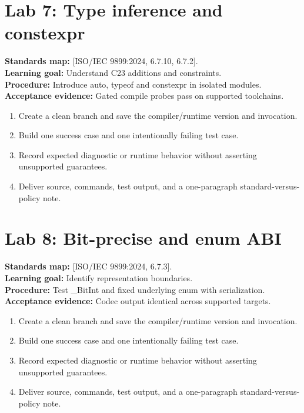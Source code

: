 \documentclass[10pt,letterpaper,oneside]{report}
\newcommand{\refcl}[1]{\textsf{\footnotesize[ISO/IEC 9899:2024, #1]}}
\begin{document}
\section{Lab 7: Type inference and constexpr}
\textbf{Standards map:} \refcl{6.7.10, 6.7.2}.\\
\textbf{Learning goal:} Understand C23 additions and constraints.\\
\textbf{Procedure:} Introduce auto, typeof and constexpr in isolated modules.\\
\textbf{Acceptance evidence:} Gated compile probes pass on supported toolchains.
\begin{enumerate}
\item Create a clean branch and save the compiler/runtime version and invocation.
\item Build one success case and one intentionally failing test case.
\item Record expected diagnostic or runtime behavior without asserting unsupported guarantees.
\item Deliver source, commands, test output, and a one-paragraph standard-versus-policy note.
\end{enumerate}

\section{Lab 8: Bit-precise and enum ABI}
\textbf{Standards map:} \refcl{6.7.3}.\\
\textbf{Learning goal:} Identify representation boundaries.\\
\textbf{Procedure:} Test \_BitInt and fixed underlying enum with serialization.\\
\textbf{Acceptance evidence:} Codec output identical across supported targets.
\begin{enumerate}
\item Create a clean branch and save the compiler/runtime version and invocation.
\item Build one success case and one intentionally failing test case.
\item Record expected diagnostic or runtime behavior without asserting unsupported guarantees.
\item Deliver source, commands, test output, and a one-paragraph standard-versus-policy note.
\end{enumerate}
\end{document}
